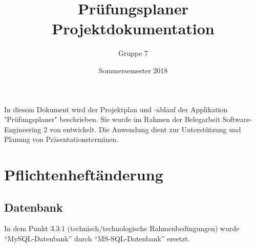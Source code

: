\documentclass{scrartcl}
\begin{document}
	\title{Prüfungsplaner \\ Projektdokumentation}
	\author{Gruppe 7}
	\date{Sommersemester 2018}
	\maketitle
	
	\tableofcontents
	
	In diesem Dokument wird der Projektplan und -ablauf der Applikation "Prüfungsplaner" beschrieben. Sie wurde im Rahmen der Belegarbeit Software-Engineering 2 von entwickelt. Die Anwendung dient zur Unterstützung und Planung von Präsentationsterminen.
	
  
  
  
  \section{Pflichtenheftänderung}
  \subsection{Datenbank}
  In dem Punkt 3.3.1 (technisch/technologische Rahmenbedingungen) wurde “MySQL-Datenbank” durch “MS-SQL-Datenbank” ersetzt.
\end{document}
